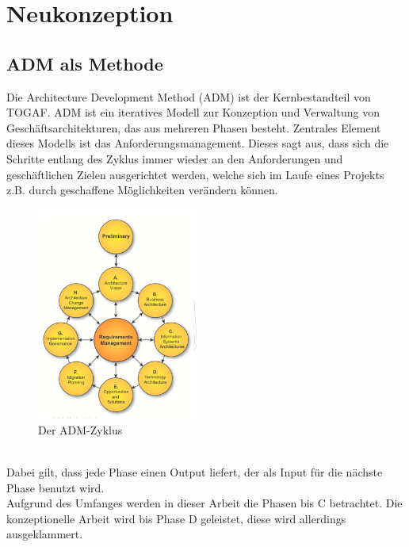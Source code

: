 \chapter{Neukonzeption}

\section{ADM als Methode}
Die Architecture Development Method (ADM) ist der Kernbestandteil von TOGAF. 
ADM ist ein iteratives Modell zur Konzeption und Verwaltung von Geschäftsarchitekturen, das aus mehreren Phasen besteht.
Zentrales Element dieses Modells ist das Anforderungsmanagement.
Dieses sagt aus, dass sich die Schritte entlang des Zyklus immer wieder an den Anforderungen und geschäftlichen Zielen ausgerichtet werden, welche sich im Laufe eines Projekts z.B. durch geschaffene Möglichkeiten verändern können.\\
\begin{figure}[!htb]
\centering
\includegraphics[height=70mm]{images/adm-cycle}
\caption[ADM-Zyklus]{Der ADM-Zyklus \protect\footnotemark}
\label{ADM-Zyklus}
\end{figure}
\\
Dabei gilt, dass jede Phase einen Output liefert, der als Input für die nächste Phase benutzt wird.\\
Aufgrund des Umfanges werden in dieser Arbeit die Phasen bis C betrachtet. Die konzeptionelle Arbeit wird bis Phase D geleistet, diese wird allerdings ausgeklammert.
